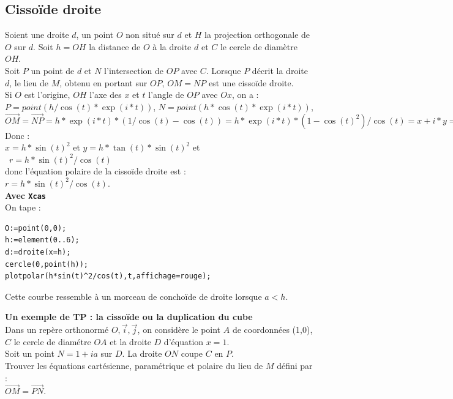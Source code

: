 \documentclass[a4paper,11pt]{book}
\begin{document}
\subsection{Cisso\"{i}de droite}
Soient une droite $d$, un point $O$ non situ\'e sur $d$ et $H$ la projection 
orthogonale de $O$ sur $d$.
Soit $h=OH$ la distance de $O$ \`a la droite $d$ et $C$ le cercle de diam\`etre
$OH$.\\
Soit $P$ un point de $d$ et $N$ l'intersection de $OP$ avec $C$.
Lorsque $P$ d\'ecrit la droite $d$, le lieu de $M$, obtenu en portant sur $OP$,
 $OM=NP$ est une cisso\"{i}de droite.\\
Si $O$ est l'origine, $OH$ l'axe des $x$ et $t$ l'angle de $OP$ avec $Ox$, 
on a :\\
$P=point(h/\cos(t)*\exp(i*t))$, $N=point(h*\cos(t)*\exp(i*t))$, 
$\overrightarrow{OM}=\overrightarrow{NP}=h*\exp(i*t)*(1/\cos(t)-\cos(t))=h*\exp(i*t)*(1-\cos(t)^2)/\cos(t)=x+i*y=r*\exp(i*t)$
Donc :\\
$x=h*\sin(t)^2$ et $y=h*\tan(t)*\sin(t)^2$ et\\\
$r=h*\sin(t)^2/\cos(t)$\\
donc l'\'equation polaire de la cisso\"{i}de droite est :\\
$r=h*\sin(t)^2/\cos(t)$.\\

{\bf Avec {\tt Xcas}}\\
On tape :\\
\begin{verbatim}
O:=point(0,0);
h:=element(0..6);
d:=droite(x=h);
cercle(0,point(h));
plotpolar(h*sin(t)^2/cos(t),t,affichage=rouge);
\end{verbatim}
Cette courbe ressemble \`a un morceau de concho\"{i}de de droite lorsque $a<h$.

{\bf Un exemple de TP : la cisso\"{i}de ou la duplication du cube}\\
Dans un rep\`ere orthonorm\'e $O,\overrightarrow{i},\overrightarrow{j}$,
on consid\`ere le point $A$ de coordonn\'ees (1,0), $C$ le cercle de diam\'etre 
$OA$ et la droite $D$ d'\'equation $x=1$.\\
Soit un point $N=1+ia$ sur $D$. La droite $ON$ coupe $C$ en $P$.\\
Trouver les \'equations cart\'esienne, param\'etrique et polaire du lieu de 
$M$ d\'efini par :\\
 $\overrightarrow{OM}=\overrightarrow{PN}$.
\end{document}
